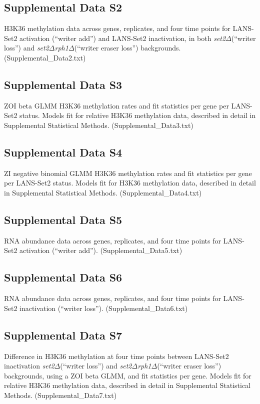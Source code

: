 \documentclass[11pt]{biorxiv}
\newcommand{\setdelt}{\emph{set2$\Delta$}\xspace}
\newcommand{\setdeltrphdelt}{\emph{set2$\Delta$rph1$\Delta$}\xspace}
\begin{document}
\subsection{Supplemental Data S2}

H3K36 methylation data across genes, replicates, and four time points for LANS-Set2 activation (``writer add'') and LANS-Set2 inactivation, in both \setdelt (``writer loss'') and \setdeltrphdelt (``writer eraser loss'') backgrounds. (Supplemental\_Data2.txt)

\subsection{Supplemental Data S3}

ZOI beta GLMM H3K36 methylation rates and fit statistics per gene per LANS-Set2 status. Models fit for relative H3K36 methylation data, described in detail in Supplemental Statistical Methods. (Supplemental\_Data3.txt)

\subsection{Supplemental Data S4}

ZI negative binomial GLMM H3K36 methylation rates and fit statistics per gene per LANS-Set2 status. Models fit for H3K36 methylation data, described in detail in Supplemental Statistical Methods. (Supplemental\_Data4.txt)

\subsection{Supplemental Data S5}

RNA abundance data across genes, replicates, and four time points for LANS-Set2 activation (``writer add''). (Supplemental\_Data5.txt)

\subsection{Supplemental Data S6}

RNA abundance data across genes, replicates, and four time points for LANS-Set2 inactivation (``writer loss''). (Supplemental\_Data6.txt)

\subsection{Supplemental Data S7}

Difference in H3K36 methylation at four time points between LANS-Set2 inactivation \setdelt (``writer loss'') and \setdeltrphdelt (``writer eraser loss'') backgrounds, using a ZOI beta GLMM, and fit statistics per gene. Models fit for relative H3K36 methylation data, described in detail in Supplemental Statistical Methods. (Supplemental\_Data7.txt)
\end{document}

